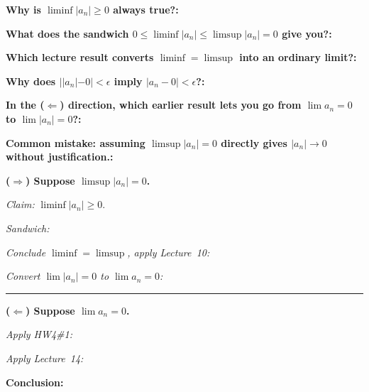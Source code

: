 \documentclass[12pt]{article}
\newcommand{\fillfield}[1]{%
  \par\noindent\textbf{#1:}\enspace\hrulefill\par\vspace{3pt}%
}
\newcommand{\writespace}[1]{\vspace{#1}}
\begin{document}
\begin{tcolorbox}[
  enhanced, breakable,
  colback  = pass3orange,
  colframe = orange!65!black,
  fonttitle = \bfseries,
  title = {Pass 3 \enspace\textbf{--}\enspace Self-Explanation}
]
\fillfield{Why is $\liminf |a_n| \geq 0$ always true?}
\fillfield{What does the sandwich $0 \leq \liminf|a_n| \leq \limsup|a_n| = 0$ give you?}
\fillfield{Which lecture result converts $\liminf = \limsup$ into an ordinary limit?}
\fillfield{Why does $||a_n| - 0| < \epsilon$ imply $|a_n - 0| < \epsilon$?}
\fillfield{In the ($\Leftarrow$) direction, which earlier result lets you go from $\lim a_n = 0$ to $\lim |a_n| = 0$?}
\fillfield{Common mistake: assuming $\limsup |a_n| = 0$ directly gives $|a_n| \to 0$ without justification.}
\end{tcolorbox}

\newpage

\begin{tcolorbox}[
  enhanced, breakable,
  colback  = pass4purple,
  colframe = purple!55!black,
  fonttitle = \bfseries,
  title = {Pass 4 \enspace\textbf{--}\enspace Skeleton Proof}
]
\noindent\textbf{($\Rightarrow$) Suppose $\limsup |a_n| = 0$.}

\medskip
\noindent\textit{Claim:} $\liminf |a_n| \geq 0$.\par
\writespace{1.4cm}

\noindent\textit{Sandwich:}\par
\writespace{1.2cm}

\noindent\textit{Conclude $\liminf = \limsup$, apply Lecture~10:}\par
\writespace{1.2cm}

\noindent\textit{Convert $\lim |a_n| = 0$ to $\lim a_n = 0$:}\par
\writespace{1.4cm}

\noindent\rule{\linewidth}{0.4pt}
\vspace{2pt}

\noindent\textbf{($\Leftarrow$) Suppose $\lim a_n = 0$.}

\medskip
\noindent\textit{Apply HW4\#1:}\par
\writespace{1.2cm}

\noindent\textit{Apply Lecture~14:}\par
\writespace{1.2cm}

\noindent\textbf{Conclusion:}\par
\writespace{0.8cm}
\end{tcolorbox}
\end{document}
